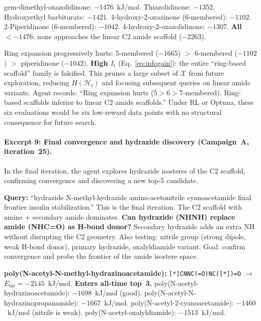 \documentclass[twocolumn]{fairmeta}
\begin{document}
\begin{toolcall}
\scriptsize
gem-dimethyl-oxazolidinone: $-1476$~kJ/mol. Thiazolidinone: $-1352$. Hydroxyethyl barbiturate: $-1421$.
4-hydroxy-2-oxazinone (6-membered): $-1102$. 2-Piperidinone (6-membered): $-1042$.
4-hydroxy-2-oxazolidinone: $-1307$.
\textbf{All} $< -1476$; none approaches the linear C2 amide scaffold ($-2263$).
\end{toolcall}

\begin{observation}
\scriptsize
Ring expansion progressively hurts: 5-membered ($-1665$) $>$ 6-membered ($-1102$) $>$ piperidinone ($-1042$).
\textbf{High $I_t$} (Eq.~\ref{eq:infogain}): the entire ``ring-based scaffold'' family is falsified.
This prunes a large subset of $\mathcal{X}$ from future exploration, reducing $H(\mathcal{H}_t)$ and focusing subsequent queries on linear amide variants.
Agent records: ``Ring expansion hurts (5$>$6$>$7-membered). Ring-based scaffolds inferior to linear C2 amide scaffolds.''
Under RL or Optuna, these six evaluations would be six low-reward data points with no structural consequence for future search.
\end{observation}

\paragraph{Excerpt 9: Final convergence and hydrazide discovery (Campaign~A, iteration~25).}
In the final iteration, the agent explores hydrazide isosteres of the C2 scaffold, confirming convergence and discovering a new top-5 candidate.

\begin{agentthought}
\scriptsize
\textbf{Query:} ``hydrazide N-methyl-hydrazide amino-acetonitrile cyanoacetamide final frontier insulin stabilization.''
This is the final iteration. The C2 scaffold with amine + secondary amide dominates.
\textbf{Can hydrazide (NHNH) replace amide (NHC=O) as H-bond donor?}
Secondary hydrazide adds an extra NH without disrupting the C2 geometry.
Also testing: nitrile group (strong dipole, weak H-bond donor), primary hydrazide, oxalyldiamide variant.
Goal: confirm convergence and probe the frontier of the amide isostere space.
\end{agentthought}

\begin{toolcall}
\scriptsize
\textbf{poly(N-acetyl-N-methyl-hydrazinoacetamide):} \texttt{[*]CNNC(=O)NC([*])=O} $\to$ $E_\text{int} = -2145$~kJ/mol. \textbf{Enters all-time top~3.}
poly(N-acetyl-hydrazinoacetamide): $-1698$~kJ/mol (good).
poly(N-acetyl-N-hydrazinopropanamide): $-1667$~kJ/mol.
poly(N-acetyl-2-cyanoacetamide): $-1460$~kJ/mol (nitrile is weak).
poly(N-acetyl-oxalyldiamide): $-1513$~kJ/mol.
\end{toolcall}
\end{document}
